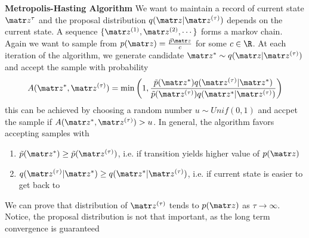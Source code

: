 \documentclass[11pt]{article}
\begin{document}
\begin{defn*}
\textbf{Metropolis-Hasting Algorithm} We want to maintain a record of current state $\bz^{\tau}$ and the proposal distribution $q(\bz | \bz^{(\tau)})$ depends on the current state. A sequence $\{\bz^{(1)}, \bz^{(2)}, \cdots \}$ forms a markov chain. Again we want to sample from $p(\bz) = \textstyle \frac{\tilde{p}{\bz}}{c}$ for some $c\in \R$. At each iteration of the algorithm, we generate candidate $\bz^* \sim q(\bz| \bz^{(\tau)})$ and accept the sample with probability 
    \[
        A(\bz^*, \bz^{(\tau)}) = \min \left( 1, \frac{\tilde{p}(\bz^*) q(\bz^{(\tau)}| \bz^*)  }{\tilde{p}(\bz^{(\tau)}) q(\bz^* | \bz^{(\tau)})} \right)
    \]
    this can be achieved by choosing a random number $u\sim Unif(0,1)$ and accpet the sample if $A(\bz^*, \bz^{(\tau)}) > u$. In general, the algorithm favors accepting samples with 
    \begin{enumerate}
        \item $\tilde{p}(\bz^*) \geq \tilde{p}(\bz^{(\tau)})$, i.e. if transition yields higher value of $p(\bz)$
        \item $q(\bz^{(\tau)}| \bz^*) \geq q(\bz^* | \bz^{(\tau)})$, i.e. if current state is easier to get back to
    \end{enumerate}
    We can prove that distribution of $\bz^{(\tau)}$ tends to $p(\bz)$ as $\tau \rightarrow \infty$. Notice, the proposal distribution is not that important, as the long term convergence is guaranteed
\end{defn*}

 
\end{document}
